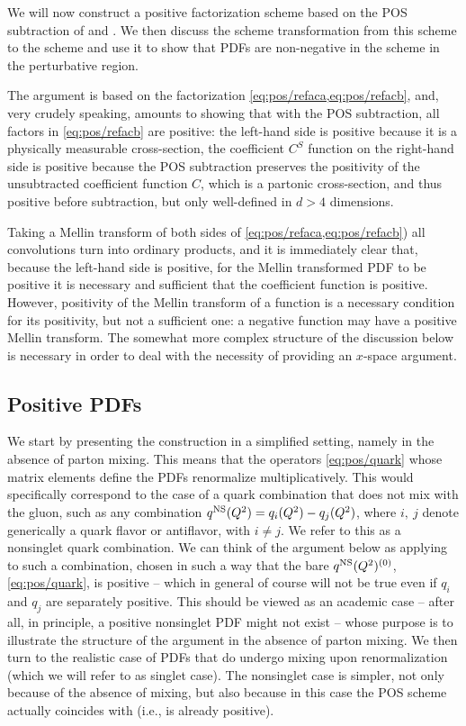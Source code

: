 
We will now construct a positive factorization scheme based on the POS 
subtraction of  and
.
We then discuss the scheme transformation from this scheme to the \msbar{}
scheme and use it to show that PDFs are non-negative in the \msbar{} scheme in
the perturbative region.

The argument is based on the factorization \cref{eq:pos/refaca,eq:pos/refacb},
and, very crudely speaking, amounts to showing that with the POS subtraction,
all factors in \cref{eq:pos/refacb} are positive: the left-hand side is
positive because it is a physically measurable cross-section, the coefficient
$C^S$ function on the right-hand side is positive because the POS subtraction
preserves the positivity of the unsubtracted coefficient function $C$, which is
a partonic cross-section, and thus positive before subtraction, but only
well-defined in $d>4$ dimensions.

Taking a Mellin transform of both sides of \cref{eq:pos/refaca,eq:pos/refacb})
all convolutions turn into ordinary products, and it is immediately clear that,
because the left-hand side is positive, for the Mellin transformed PDF to be
positive it is necessary and sufficient that the coefficient  function is
positive. 
However,  positivity of the Mellin transform of a function is a necessary
condition for its positivity, but not a sufficient one: a negative function may
have a positive Mellin transform. The somewhat more complex structure of the
discussion below is necessary in order to deal with the necessity of providing
an $x$-space argument.


\subsection{Positive PDFs}
\label{sec:pospdf}

We start by presenting the construction in a simplified setting,  namely in the
absence of parton mixing. 
This means that the operators \cref{eq:pos/quark} whose matrix elements
define the PDFs renormalize multiplicatively.
This would specifically correspond to the case of a quark combination that does
not mix with the gluon, such as  any combination
$q^{{\textrm{NS}}}(Q^2)=q_i(Q^2)-q_j(Q^2)$, where $i,\>j$ denote generically a quark
flavor or antiflavor, with $i\not= j$.
We refer to this as a  nonsinglet quark combination. We can think of the
argument below as applying to such a combination,  chosen in such a way that 
the bare $q^{{\textrm{NS}}}(Q^2)^{(0)}$, \cref{eq:pos/quark}, is positive -- which
in general of course will not be true even if $q_i$ and $q_j$ are separately
positive. 
This should be viewed as an academic case -- after all, in principle, a
positive nonsinglet PDF might not exist -- whose purpose is to illustrate the
structure of the argument in the absence of parton mixing. 
We then turn to the realistic case of PDFs that do undergo mixing upon
renormalization (which we will refer to as singlet case).
The nonsinglet case is simpler, not only because of the absence of mixing, but
also because in  this case the POS scheme actually coincides with \msbar{}
(i.e., \msbar{} is already positive). 

